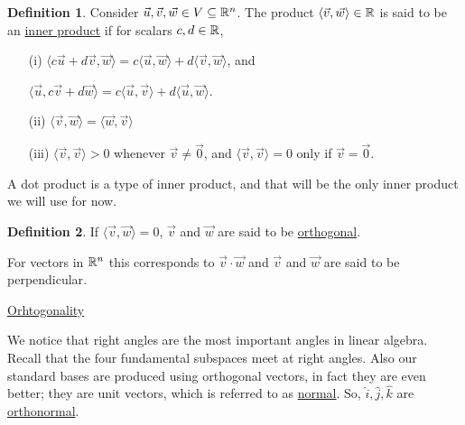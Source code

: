 \documentclass[reqno]{amsart}
\theoremstyle{definition}
\newtheorem{definition}{Definition}
\begin{document}
\begin{definition}
Consider $\vec{u},\vec{v},\vec{w} \in V \subseteq \mathbb{R}^n$.  The product $\langle \vec{v},\vec{w}\rangle \in \mathbb{R}$ is said to be an \underline{\color{red}inner product} if for scalars $c, d \in \mathbb{R}$,
%
\begin{itemize}

\item[(i)]  $\langle c\vec{u} + d\vec{v},\vec{w}\rangle = c\langle\vec{u},\vec{w}\rangle + d\langle\vec{v},\vec{w}\rangle$, and

$\langle\vec{u},c\vec{v}+d\vec{w}\rangle = c\langle\vec{u},\vec{v}\rangle + d\langle\vec{u},\vec{w}\rangle$.

\item[(ii)]  $\langle \vec{v},\vec{w}\rangle = \langle \vec{w},\vec{v}\rangle$

\item[(iii)]  $\langle\vec{v},\vec{v}\rangle > 0$ whenever $\vec{v} \neq \vec{0}$, and
$\langle\vec{v},\vec{v}\rangle = 0$ only if $\vec{v} = \vec{0}$.

\end{itemize}
\end{definition}

{\color{blue}A dot product is a type of inner product, and that will be the only inner product we will use for now.}

\begin{definition}
If $\langle\vec{v},\vec{w}\rangle = 0$, $\vec{v}$ and $\vec{w}$ are said to be \underline{\color{red}orthogonal}.
\end{definition}

{\color{blue}For vectors in $\mathbb{R}^n$ this corresponds to $\vec{v}\cdot\vec{w}$ and $\vec{v}$ and $\vec{w}$ are said to be perpendicular}.

\bigskip

\underline{Orhtogonality}

We notice that right angles are the most important angles in linear algebra.  Recall that the four fundamental
subspaces meet at right angles.  Also our standard bases are produced using orthogonal vectors, in fact they
are even better; they are unit vectors, which is referred to as \underline{normal}.  So, $\hat{i}, \hat{j}, \hat{k}$
are \underline{orthonormal}.
\end{document}
